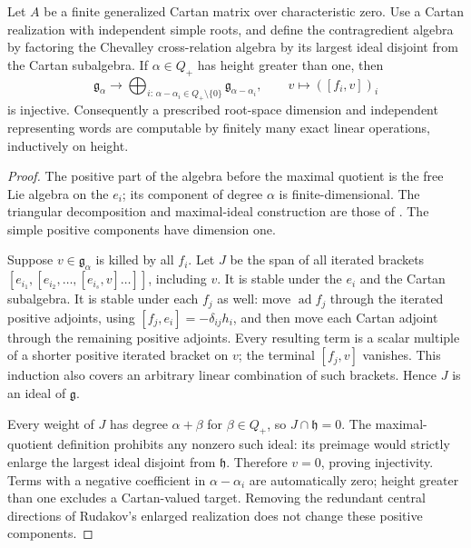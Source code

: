 \begin{proposition}\ours
Let \(A\) be a finite generalized Cartan matrix over characteristic zero. Use a Cartan realization with independent simple roots, and define the contragredient algebra by factoring the Chevalley cross-relation algebra by its largest ideal disjoint from the Cartan subalgebra. If \(\alpha\in Q_+\) has height greater than one, then
\[
 \mathfrak g_\alpha\longrightarrow
 \bigoplus_{i:\,\alpha-\alpha_i\in Q_+\setminus\{0\}}
 \mathfrak g_{\alpha-\alpha_i},\qquad
 v\longmapsto([f_i,v])_i
\]
is injective. Consequently a prescribed root-space dimension and independent representing words are computable by finitely many exact linear operations, inductively on height.
\end{proposition}
\begin{proof}
The positive part of the algebra before the maximal quotient is the free Lie algebra on the \(e_i\); its component of degree \(\alpha\) is finite-dimensional. The triangular decomposition and maximal-ideal construction are those of \citet[Chapter II, \S1]{kac1968graded}. The simple positive components have dimension one.

Suppose \(v\in\mathfrak g_\alpha\) is killed by all \(f_i\). Let \(J\) be the span of all iterated brackets
\(
 [e_{i_1},[e_{i_2},\ldots,[e_{i_s},v]\ldots]]
\), including \(v\). It is stable under the \(e_i\) and the Cartan subalgebra. It is stable under each \(f_j\) as well: move \(\operatorname{ad}f_j\) through the iterated positive adjoints, using
\([f_j,e_i]=-\delta_{ij}h_i\), and then move each Cartan adjoint through the remaining positive adjoints. Every resulting term is a scalar multiple of a shorter positive iterated bracket on \(v\); the terminal \([f_j,v]\) vanishes. This induction also covers an arbitrary linear combination of such brackets. Hence \(J\) is an ideal of \(\mathfrak g\).

Every weight of \(J\) has degree \(\alpha+\beta\) for \(\beta\in Q_+\), so \(J\cap\mathfrak h=0\). The maximal-quotient definition prohibits any nonzero such ideal: its preimage would strictly enlarge the largest ideal disjoint from \(\mathfrak h\). Therefore \(v=0\), proving injectivity. Terms with a negative coefficient in \(\alpha-\alpha_i\) are automatically zero; height greater than one excludes a Cartan-valued target. Removing the redundant central directions of Rudakov's enlarged realization does not change these positive components.


\end{proof}
